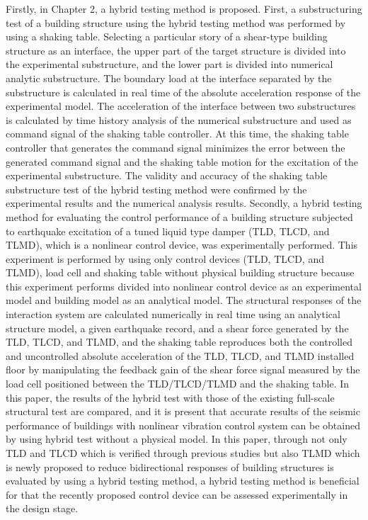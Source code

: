 Firstly, in Chapter 2, a hybrid testing method is proposed. First, a substructuring test of a building structure using the hybrid testing method was performed by using a shaking table. Selecting a particular story of a shear-type building structure as an interface, the upper part of the target structure is divided into the experimental substructure, and the lower part is divided into numerical analytic substructure. The boundary load at the interface separated by the substructure is calculated in real time of the absolute acceleration response of the experimental model. The acceleration of the interface between two substructures is calculated by time history analysis of the numerical substructure and used as command signal of the shaking table controller. At this time, the shaking table controller that generates the command signal minimizes the error between the generated command signal and the shaking table motion for the excitation of the experimental substructure. The validity and accuracy of the shaking table substructure test of the hybrid testing method were confirmed by the experimental results and the numerical analysis results. Secondly, a hybrid testing method for evaluating the control performance of a building structure subjected to earthquake excitation of a tuned liquid type damper (TLD, TLCD, and TLMD), which is a nonlinear control device, was experimentally performed. This experiment is performed by using only control devices (TLD, TLCD, and TLMD), load cell and shaking table without physical building structure because this experiment performs divided into nonlinear control device as an experimental model and building model as an analytical model. The structural responses of the interaction system are calculated numerically in real time using an analytical structure model, a given earthquake record, and a shear force generated by the TLD, TLCD, and TLMD, and the shaking table reproduces both the controlled and uncontrolled absolute acceleration of the TLD, TLCD, and TLMD installed floor by manipulating the feedback gain of the shear force signal measured by the load cell positioned between the TLD/TLCD/TLMD and the shaking table. In this paper, the results of the hybrid test with those of the existing full-scale structural test are compared, and it is present that accurate results of the seismic performance of buildings with nonlinear vibration control system can be obtained by using hybrid test without a physical model. In this paper, through not only TLD and TLCD which is verified through previous studies but also TLMD which is newly proposed to reduce bidirectional responses of building structures is evaluated by using a hybrid testing method, a hybrid testing method is beneficial for that the recently proposed control device can be assessed experimentally in the design stage.

